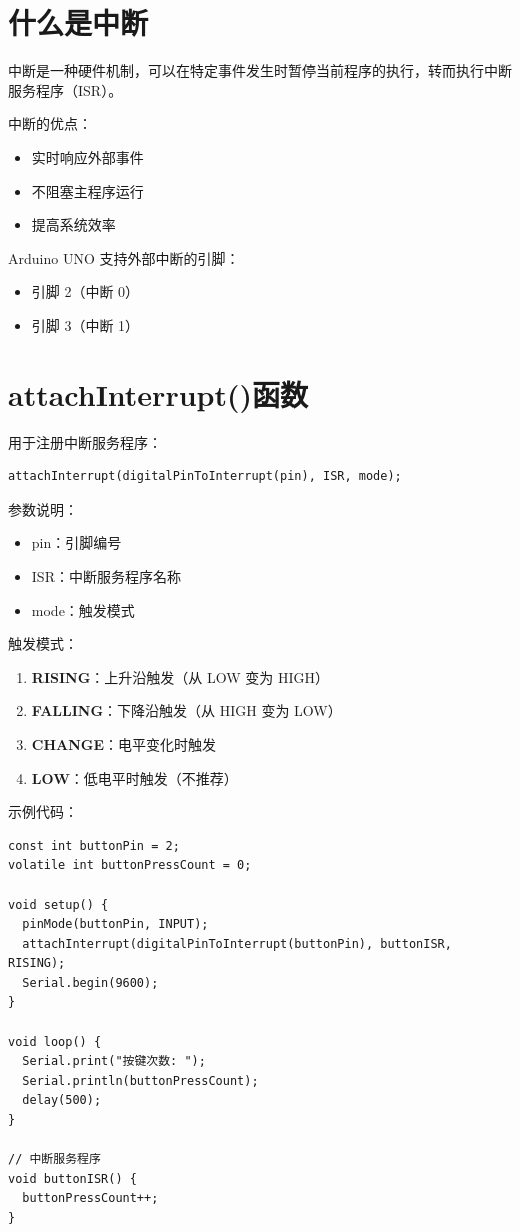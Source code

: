 \documentclass[12pt,UTF8]{ctexbook}
\begin{document}
\section{什么是中断}

中断是一种硬件机制，可以在特定事件发生时暂停当前程序的执行，转而执行中断服务程序（ISR）。

中断的优点：
\begin{itemize}
    \item 实时响应外部事件
    \item 不阻塞主程序运行
    \item 提高系统效率
\end{itemize}

Arduino UNO 支持外部中断的引脚：
\begin{itemize}
    \item 引脚 2（中断 0）
    \item 引脚 3（中断 1）
\end{itemize}

\section{attachInterrupt()函数}

用于注册中断服务程序：

\begin{lstlisting}
attachInterrupt(digitalPinToInterrupt(pin), ISR, mode);
\end{lstlisting}

参数说明：
\begin{itemize}
    \item pin：引脚编号
    \item ISR：中断服务程序名称
    \item mode：触发模式
\end{itemize}

触发模式：
\begin{enumerate}
    \item \textbf{RISING}：上升沿触发（从 LOW 变为 HIGH）
    \item \textbf{FALLING}：下降沿触发（从 HIGH 变为 LOW）
    \item \textbf{CHANGE}：电平变化时触发
    \item \textbf{LOW}：低电平时触发（不推荐）
\end{enumerate}

示例代码：
\begin{lstlisting}
const int buttonPin = 2;
volatile int buttonPressCount = 0;

void setup() {
  pinMode(buttonPin, INPUT);
  attachInterrupt(digitalPinToInterrupt(buttonPin), buttonISR, RISING);
  Serial.begin(9600);
}

void loop() {
  Serial.print("按键次数: ");
  Serial.println(buttonPressCount);
  delay(500);
}

// 中断服务程序
void buttonISR() {
  buttonPressCount++;
}
\end{lstlisting}
\end{document}
